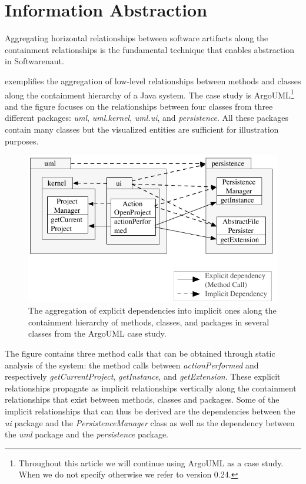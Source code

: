\documentclass[preprint,12pt]{elsarticle}
\newcommand{\cd}[1]{{\em{#1}}}
\newcommand\on[1]{\nbc{ON}{#1}{red}} %
\begin{document}
\section {Information Abstraction} \label{sec:org}

Aggregating horizontal relationships between software artifacts along the containment relationships is the fundamental technique that enables abstraction in Softwarenaut. 

 exemplifies the aggregation of low-level relationships between methods and classes along the containment hierarchy of a Java system. The case study is ArgoUML\footnote{Throughout this article we will continue using ArgoUML as a case study. When we do not specify otherwise we refer to version 0.24.} and the figure focuses on the relationships between four classes from three different packages: \cd{uml}, \cd{uml.kernel}, \cd{uml.ui}, and \cd{persistence}. All these packages contain many classes but the visualized entities are sufficient for illustration purposes. 

\begin{figure}[ht]
\begin{center}
\includegraphics[width=0.75\linewidth]{DependencyAggregation}
\caption{The aggregation of explicit dependencies into implicit ones along the containment hierarchy of methods, classes, and packages in several classes from the ArgoUML case study.}
\end{center}
\end{figure}
 
The figure contains three method calls that can be obtained through static analysis of the system: the method calls between \cd{actionPerformed} and respectively \cd{getCurrentProject}, \cd{getInstance}, and \cd{getExtension}. These explicit relationships propagate as implicit relationships vertically along the containment relationships that exist between methods, classes and packages. Some of the implicit relationships that can thus be derived are the dependencies between the \cd{ui} package and the \cd{PersistenceManager} class as well as the dependency between the \cd{uml} package and the \cd{persistence} package. 
\end{document}
